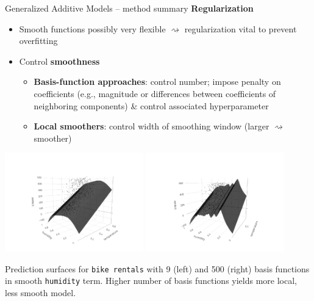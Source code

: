 \documentclass[11pt,compress,t,notes=noshow, xcolor=table]{beamer}
\newcommand{\highlight}[1]{\textcolor{hlcol}{\textbf{#1}}}
\begin{document}
\begin{frame2}{Generalized Additive Models -- method summary}
\highlight{Regularization}
\begin{itemize}
    \item Smooth functions possibly very flexible $\rightsquigarrow$
    regularization vital to prevent overfitting
    \item Control \textbf{smoothness}
    \begin{itemize}
      \item \textbf{Basis-function approaches}: control number; impose penalty
      on coefficients
      (e.g., magnitude or differences between coefficients of neighboring
      components) \& control associated hyperparameter
      \item \textbf{Local smoothers}: control width of smoothing window
      (larger $\rightsquigarrow$ smoother)
    \end{itemize}
\end{itemize}

\begin{minipage}{0.65\textwidth}
\includegraphics[width=0.45\textwidth, trim=0 0 80 80, clip]{
figure/gam_bike_pred}
\includegraphics[width=0.45\textwidth, trim=80 0 0 80, clip]{
figure/gam_bike_pred_wiggly}
\hfill
\end{minipage}
\begin{minipage}{0.3\textwidth}
\tiny \raggedright
Prediction surfaces for \texttt{bike rentals} with 9 (left) and 500 (right)
basis functions in smooth \texttt{humidity} term.
Higher number of basis functions yields more local, less smooth model.
\end{minipage}

\end{frame2}
\end{document}
